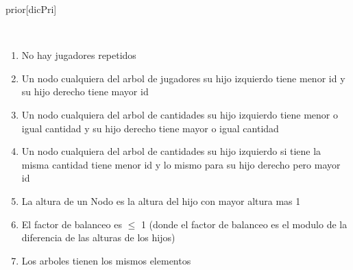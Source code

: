 \begin{Representacion}

	\begin{Estructura}{prior}[dicPri]
		\begin{Tupla}[dicPri]
		\end{Tupla}

		~ 

		\begin{Tupla}[Nodo]
		\end{Tupla}
	\end{Estructura}


	\begin{enumerate}
		
		\item No hay jugadores repetidos

		\item Un nodo cualquiera del arbol de jugadores su hijo izquierdo tiene menor id y su hijo derecho tiene mayor id

		\item Un nodo cualquiera del arbol de cantidades su hijo izquierdo tiene menor o igual cantidad y su hijo derecho tiene mayor o igual cantidad

		\item Un nodo cualquiera del arbol de cantidades su hijo izquierdo si tiene la misma cantidad tiene menor id y lo mismo para su hijo derecho pero mayor id

		\item La altura de un Nodo es la altura del hijo con mayor altura mas 1

		\item El factor de balanceo es $\leq$ 1 (donde el factor de balanceo es el modulo de la diferencia de las alturas de los hijos)

		\item Los arboles tienen los mismos elementos

	\end{enumerate}
	


\end{Representacion}
